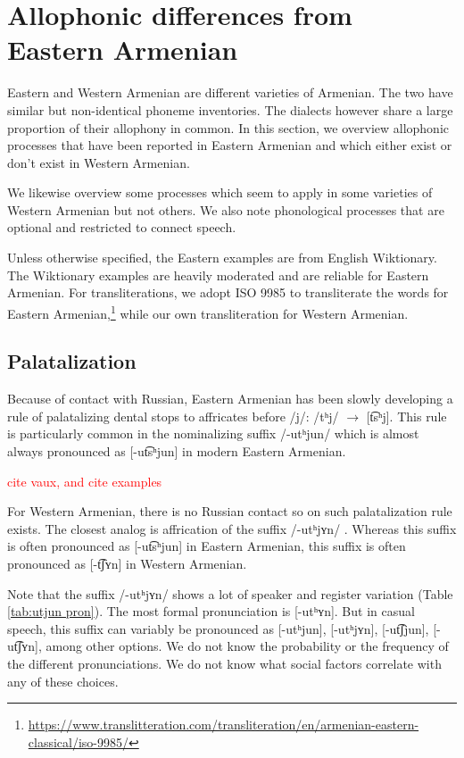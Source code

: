   	\section{Allophonic differences from Eastern Armenian}\label{section:segmentalPhono:alloEastern}
  	
  	Eastern and Western Armenian are different varieties of Armenian. The two have similar but non-identical phoneme inventories. The dialects however share a large proportion of their allophony in common. In this section, we overview allophonic processes that have been reported in Eastern Armenian and which either exist or don't exist in Western Armenian. 
  	
  	We likewise overview some processes which seem to apply in some varieties of Western Armenian but not others. We also note phonological processes that are optional and restricted to connect speech. 
  	
  	Unless otherwise specified, the Eastern examples are from English Wiktionary. The Wiktionary examples are heavily moderated and are reliable for Eastern Armenian. For transliterations, we adopt ISO 9985 to transliterate the words for Eastern Armenian,\footnote{\url{https://www.translitteration.com/transliteration/en/armenian-eastern-classical/iso-9985/}} while our own transliteration for Western Armenian.
  	
  	
  	\subsection{Palatalization}\label{section:segmentalPhono:alloEastern:palatalization}
  	Because of contact with Russian, Eastern Armenian has been slowly developing a rule of palatalizing dental stops to affricates before /j/: /tʰj/ $\rightarrow$ [t͡sʰj]. This rule is particularly common in the nominalizing suffix /-utʰjun/  which is almost always pronounced as [-ut͡sʰjun] in modern Eastern Armenian. 
  	
  	\textcolor{red}{cite vaux, and cite examples}
  	
  	For Western Armenian, there is no Russian contact so on such palatalization rule exists. The closest analog is affrication of the suffix /-utʰjʏn/ . Whereas this suffix is often pronounced as [-ut͡sʰjun] in Eastern Armenian, this suffix is often pronounced as [-t͡ʃʏn] in Western Armenian. 
  	
  	Note that the suffix /-utʰjʏn/ shows a lot of speaker and register variation (Table \ref{tab:utjun pron}). The most formal pronunciation is [-utʰʏn]. But in casual speech, this suffix can variably be pronounced as [-utʰjun], [-utʰjʏn], [-ut͡ʃjun], [-ut͡ʃʏn], among other options. We do not know the probability or the frequency of the different pronunciations. We do not know what social factors correlate with any of these choices. 
  	
